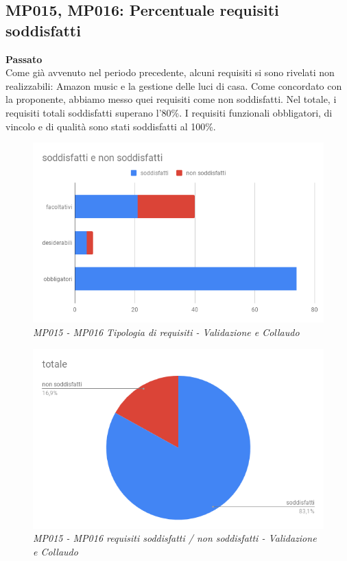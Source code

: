 \subsection{MP015, MP016: Percentuale requisiti soddisfatti}
\textbf{Passato}\\
Come già avvenuto nel periodo precedente, alcuni requisiti si sono rivelati non realizzabili: Amazon music e la gestione delle luci di casa. Come concordato con la proponente, abbiamo messo quei requisiti come non soddisfatti.
Nel totale, i requisiti totali soddisfatti superano l'80\%. I requisiti funzionali obbligatori, di vincolo e di qualità sono stati soddisfatti al 100\%. 
\begin{figure} [H]
    \centering
	\includegraphics[scale=0.5]{./images/RA_reqg.png}
    \caption{\textit{MP015 - MP016 Tipologia di requisiti - Validazione e Collaudo}}
\end{figure}
\begin{figure} [H]
    \centering
	\includegraphics[scale=0.5]{./images/RA_totsod.png}
    \caption{\textit{MP015 - MP016  requisiti soddisfatti / non soddisfatti - Validazione e Collaudo}}
\end{figure}

